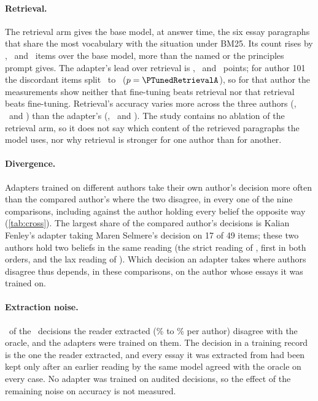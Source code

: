 \paragraph{Retrieval.}
The retrieval arm gives the base model, at answer time, the six essay paragraphs that share
the most vocabulary with the situation under BM25. Its count rises by \LiftARetrieval,
\LiftBRetrieval\ and \LiftCRetrieval\ items over the base model, more than the named or the
principles prompt gives. The adapter's lead over retrieval is \LeadPtsTunedRetrievalA,
\LeadPtsTunedRetrievalB\ and \LeadPtsTunedRetrievalC\ points; for author 101 the discordant items
split \OnlyFirstTunedRetrievalA\ to \OnlySecondTunedRetrievalA\ ($p=\PTunedRetrievalA$), so for
that author the measurements show neither that fine-tuning beats retrieval nor that retrieval
beats fine-tuning. Retrieval's accuracy varies more across the three authors (\AccARetrieval,
\AccBRetrieval\ and \AccCRetrieval) than the adapter's (\AccATuned, \AccBTuned\ and \AccCTuned).
The study contains no ablation of the retrieval arm, so it does not say which content of the
retrieved paragraphs the model uses, nor why retrieval is stronger for one author than for
another.

\paragraph{Divergence.}
Adapters trained on different authors take their own author's decision more often than the
compared author's where the two disagree, in every one of the nine comparisons, including
against the author holding every belief the opposite way (\cref{tab:cross}). The largest
share of the compared author's decisions is Kalian Fenley's adapter taking Maren Selmere's
decision on 17 of 49 items; these two authors hold two beliefs in the same reading (the
strict reading of , first in both orders, and the lax reading of
). Which decision an adapter takes where authors disagree thus depends,
in these comparisons, on the author whose essays it was trained on.

\paragraph{Extraction noise.}
\AuditDisagreeAll\ of the \AuditKeptAll\ decisions the reader extracted
(\AuditDisagreeRateMin\% to \AuditDisagreeRateMax\% per author) disagree with the oracle, and
the adapters were trained on them. The decision in a training record is the one the reader
extracted, and every essay it was extracted from had been kept only after an earlier reading
by the same model agreed with the oracle on every case. No adapter
was trained on audited decisions, so the effect of the remaining noise on accuracy is not
measured.

